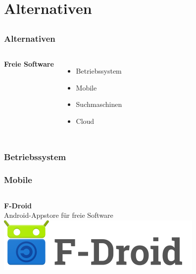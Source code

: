 \documentclass[12pt, table]{beamer}
\begin{document}
\section{Alternativen}
\subsection{}

\begin{frame}
	\frametitle{Alternativen}
	\begin{columns}
	\column{6.5cm}
	\textbf{Freie Software}
	\begin{itemize}
		\item Betriebssystem
		\item Mobile
		\item Suchmaschinen
		\item Cloud
	\end{itemize}
	\end{columns}
\end{frame}

\begin{frame}
	\frametitle{Betriebssystem}
\end{frame}

\begin{frame}
	\frametitle{Mobile}
	\begin{columns}
    \column{6.5cm}
    \textbf{F-Droid}\\
    Android-Appstore für freie Software
    \includegraphics{../img/fdroid.png}
    \end{columns}
\end{frame}
\end{document}
